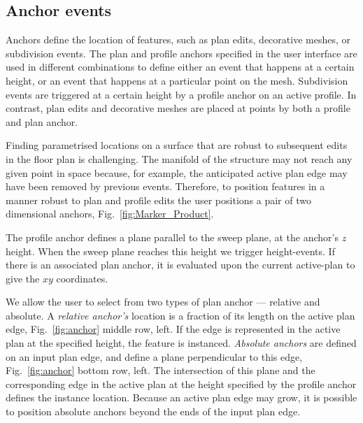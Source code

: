 \FloatBarrier

\subsection{Anchor events}
\label{sec:anchors}

Anchors define the location of features, such as plan edits, decorative meshes, or subdivision events. The plan and profile anchors specified in the user interface are used in different combinations to define either an event that happens at a certain height, or an event that happens at a particular point on the mesh. Subdivision events are triggered at a certain height by a profile anchor on an active profile. In contrast, plan edits and decorative meshes are placed at points by both a profile and plan anchor.

Finding parametrised locations on a surface that are robust to subsequent edits in the floor plan is challenging. The manifold of the structure may not reach any given point in space because, for example, the anticipated active plan edge may have been removed by previous events. Therefore, to position features in a manner robust to plan and profile edits the user positions a pair of two dimensional anchors, Fig.~\ref{fig:Marker_Product}. 

The profile anchor defines a plane parallel to the sweep plane, at the anchor's $z$ height. When the sweep plane reaches this height we trigger height-events. If there is an associated plan anchor, it is evaluated upon the current active-plan to give the $xy$ coordinates.

We allow the user to select from two types of plan anchor --- relative and absolute. 
A \emph{relative anchor's} location is a fraction of its length on the active plan edge,  Fig.~\ref{fig:anchor} middle row, left. If the edge is represented in the active plan at the specified height, the feature is instanced.
\emph{Absolute anchors} are defined on an input plan edge, and define a plane perpendicular to this edge, Fig.~\ref{fig:anchor} bottom row, left. The intersection of this plane and the corresponding edge in the active plan at the height specified by the profile anchor defines the instance location. Because an active plan edge may grow, it is possible to position absolute anchors beyond the ends of the input plan edge.

